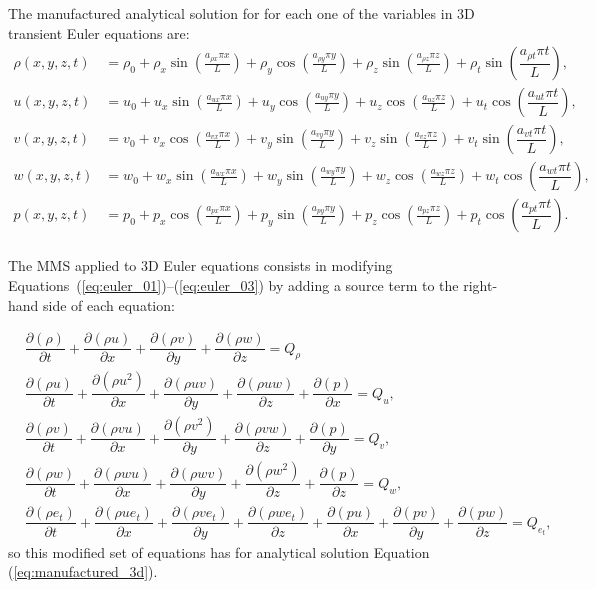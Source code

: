 \documentclass[10pt]{article}
\newcommand{\Diff}[2] {\dfrac{\partial( #1)}{\partial #2}}
\begin{document}
The manufactured analytical solution for for each one of the variables in 3D transient Euler equations are:
\begin{equation}
\begin{split}
\label{eq:manufactured_3d}
\rho\left( x ,y ,z,t\right) &=  \rho_{0}+ \rho_{x} \sin\left(\frac{a_{ \rho  x} \pi x}{L}\right)+ \rho_{y} \cos\left(\frac{a_{ \rho  y} \pi y}{L}\right) + \rho_{z} \sin\left(\frac{a_{ \rho  z} \pi z}{L}\right) + \rho_t \sin\left(\dfrac{a_{\rho t} \pi t}{L}\right),\\
u\left( x ,y ,z,t\right) &= u_{0}+u_{x} \sin\left(\frac{a_{u  x} \pi x}{L}\right)+u_{y} \cos\left(\frac{a_{u  y} \pi y}{L}\right)+u_{z} \cos\left(\frac{a_{u  z} \pi z}{L}\right) + u_t \cos\left(\dfrac{a_{u t} \pi t}{L}\right),\\
v\left( x ,y ,z,t\right) &= v_{0}+v_{x} \cos\left(\frac{a_{v  x} \pi x}{L}\right)+v_{y} \sin\left(\frac{a_{v  y} \pi y}{L}\right)+v_{z} \sin\left(\frac{a_{v  z} \pi z}{L}\right)+ v_t \sin\left(\dfrac{a_{v t} \pi t}{L}\right), \\
w\left( x ,y ,z,t\right) &= w_{0}+w_{x} \sin\left(\frac{a_{w  x} \pi x}{L}\right)+w_{y} \sin\left(\frac{a_{w  y} \pi y}{L}\right)+ w_{z} \cos\left(\frac{a_{w  z} \pi z}{L}\right)+ w_t \cos\left(\dfrac{a_{w t} \pi t}{L}\right) ,\\
p\left( x ,y ,z,t\right) &= p_{0}+p_{x} \cos\left(\frac{a_{p  x} \pi x}{L}\right)+p_{y} \sin\left(\frac{a_{p  y} \pi y}{L}\right)+ p_{z} \cos\left(\frac{a_{p  z} \pi z}{L}\right)+ p_t \cos\left(\dfrac{a_{p t} \pi t}{L}\right).\\
\end{split}
\end{equation}


The MMS applied to 3D Euler equations consists in modifying Equations~(\ref{eq:euler_01})--(\ref{eq:euler_03}) by adding a source term to the right-hand side of each equation:

\begin{equation}
\begin{split}
\label{eq:euler_3d_mod}
&\Diff{\rho}{t} +\Diff{\rho u}{x}+\Diff{\rho v}{y} + \Diff{\rho w}{z} = Q_\rho\\
%
 &\Diff{\rho u}{t} + \Diff{\rho u^2 }{x}+\Diff{\rho uv}{y} +\Diff{\rho uw}{z} +\Diff{p}{x}= Q_u,\\
%
&\Diff{\rho v}{t} + \Diff{\rho vu }{x}+\Diff{\rho v^2}{y} +\Diff{\rho vw}{z}+\Diff{p}{y}= Q_v,\\
%
&\Diff{\rho w}{t} + \Diff{\rho w u }{ x}+\Diff{\rho w v }{ y}+\Diff{\rho w^2 }{ z}+\Diff{p}{z}=Q_w,\\
%
&\Diff{\rho e_t}{t} +\Diff{\rho u e_t}{x}+\Diff{\rho v e_t}{y}+\Diff{\rho w e_t}{z}+\Diff{pu}{x}+\Diff{pv}{y}+\Diff{pw}{z} =Q_{e_t},
\end{split}
\end{equation}
so this modified set of equations has for analytical solution Equation (\ref{eq:manufactured_3d}).
\end{document}
